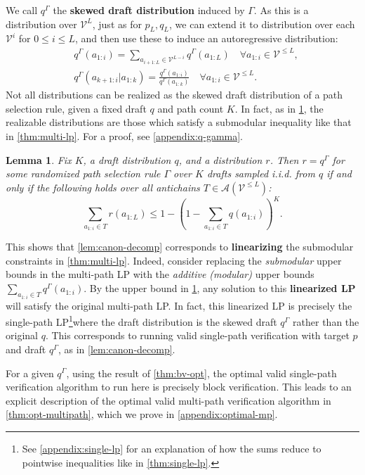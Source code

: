\documentclass{article}
\theoremstyle{plain}
\newtheorem{lemma}[theorem]{Lemma}
\theoremstyle{definition}
\theoremstyle{remark}
\newcommand{\V}{\mathcal{V}}
\begin{document}
We call $q^\Gamma$ the \textbf{skewed draft distribution} induced by $\Gamma$. As this is a distribution over $\V^L$, just as for $p_L,q_L$, we can extend it to distribution over each $\V^i$ for $0 \leq i \leq L$, and then use these to induce an autoregressive distribution:
\begin{align}
    &q^\Gamma(a_{1:i}) = \sum_{a_{i+1:L} \in \V^{L-i}} q^\Gamma(a_{1:L}) \quad \forall a_{1:i} \in \V^{\leq L},\\
    &q^\Gamma(a_{k+1:i}|a_{1:k}) = \frac{q^\Gamma(a_{1:i})}{q^\Gamma(a_{1:k})} \quad \forall a_{1:i} \in \V^{\leq L}.
    \label{eqn:auto}
\end{align}
Not all distributions can be realized as the skewed draft distribution of a path selection rule, given a fixed draft $q$ and path count $K$. In fact, as in \cref{lem:q-gamma}, the realizable distributions are those which satisfy a submodular inequality like that in \cref{thm:multi-lp}. For a proof, see \cref{appendix:q-gamma}.
\begin{lemma}
    Fix $K$, a draft distribution $q$, and a distribution $r$. Then $r=q^\Gamma$ for some randomized path selection rule $\Gamma$ over $K$ drafts sampled i.i.d. from $q$ if and only if the following holds over all antichains $T \in \mathcal{A}(\V^{\leq L})$:
    \begin{equation}
        \sum_{a_{1:i} \in T} r(a_{1:L}) \leq 1-\left(1-\sum_{a_{1:i}\in T} q(a_{1:i})\right)^K.
    \end{equation}
    \label{lem:q-gamma}
\end{lemma}

This shows that \cref{lem:canon-decomp} corresponds to \textbf{linearizing} the submodular constraints in \cref{thm:multi-lp}. Indeed, consider replacing the \textit{submodular} upper bounds in the multi-path LP with the \textit{additive (modular)} upper bounds $\sum_{a_{1:i} \in T} q^\Gamma(a_{1:i})$. By the upper bound in \cref{lem:q-gamma}, any solution to this \textbf{linearized LP} will satisfy the original multi-path LP. In fact, this linearized LP is precisely the single-path LP\footnote{See \cref{appendix:single-lp} for an explanation of how the sums reduce to pointwise inequalities like in \cref{thm:single-lp}.}where the draft distribution is the skewed draft $q^\Gamma$ rather than the original $q$. This corresponds to running valid single-path verification with target $p$ and draft $q^\Gamma$, as in \cref{lem:canon-decomp}.

For a given $q^\Gamma$, using the result of \cref{thm:bv-opt}, the optimal valid single-path verification algorithm to run here is precisely block verification. This leads to an explicit description of the optimal valid multi-path verification algorithm in \cref{thm:opt-multipath}, which we prove in \cref{appendix:optimal-mp}. 
\end{document}
